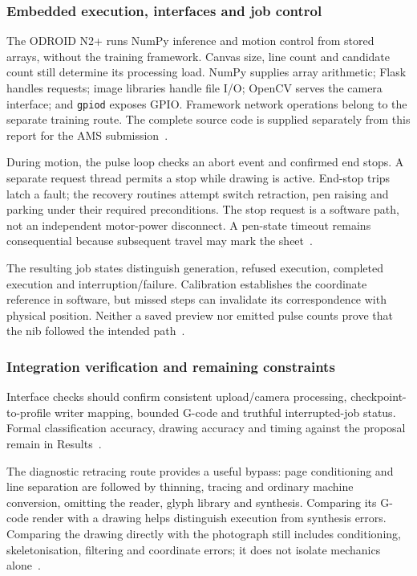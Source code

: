 \subsubsection{Embedded execution, interfaces and job control}
The ODROID N2+ runs NumPy inference and motion control from stored arrays, without the training framework. Canvas size, line count and candidate count still determine its processing load. NumPy supplies array arithmetic; Flask handles requests; image libraries handle file I/O; OpenCV serves the camera interface; and \texttt{gpiod} exposes GPIO. Framework network operations belong to the separate training route. The complete source code is supplied separately from this report for the AMS submission~\cite[recognise.py; trainlibrary.py; web/server.py; web/camera.py; reproduce.py]{braunepipeline2026}.

During motion, the pulse loop checks an abort event and confirmed end stops. A separate request thread permits a stop while drawing is active. End-stop trips latch a fault; the recovery routines attempt switch retraction, pen raising and parking under their required preconditions. The stop request is a software path, not an independent motor-power disconnect. A pen-state timeout remains consequential because subsequent travel may mark the sheet~\cite[reproduce.py; web/server.py]{braunepipeline2026}.

The resulting job states distinguish generation, refused execution, completed execution and interruption/failure. Calibration establishes the coordinate reference in software, but missed steps can invalidate its correspondence with physical position. Neither a saved preview nor emitted pulse counts prove that the nib followed the intended path~\cite[web/server.py; reproduce.py]{braunepipeline2026}.

\subsubsection{Integration verification and remaining constraints}
Interface checks should confirm consistent upload/camera processing, checkpoint-to-profile writer mapping, bounded G-code and truthful interrupted-job status. Formal classification accuracy, drawing accuracy and timing against the proposal remain in Results~\cite[web/server.py; paths.py; reproduce.py]{braunepipeline2026}.

The diagnostic retracing route provides a useful bypass: page conditioning and line separation are followed by thinning, tracing and ordinary machine conversion, omitting the reader, glyph library and synthesis. Comparing its G-code render with a drawing helps distinguish execution from synthesis errors. Comparing the drawing directly with the photograph still includes conditioning, skeletonisation, filtering and coordinate errors; it does not isolate mechanics alone~\cite[retrace.py, RetracePage]{braunepipeline2026}.


